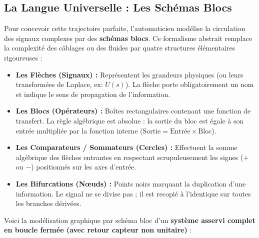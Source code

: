 \documentclass[11pt,a4paper]{report}
\begin{document}
\subsection{La Langue Universelle : Les Schémas Blocs}

Pour concevoir cette trajectoire parfaite, l'automaticien modélise la circulation des signaux complexes par des \textbf{schémas blocs}. Ce formalisme abstrait remplace la complexité des câblages ou des fluides par quatre structures élémentaires rigoureuses :
\begin{itemize}
    \item \textbf{Les Flèches (Signaux) :} Représentent les grandeurs physiques (ou leurs transformées de Laplace, ex: $U(s)$). La flèche porte obligatoirement un nom et indique le sens de propagation de l'information.
    \item \textbf{Les Blocs (Opérateurs) :} Boîtes rectangulaires contenant une fonction de transfert. La règle algébrique est absolue : la sortie du bloc est égale à son entrée multipliée par la fonction interne ($\text{Sortie} = \text{Entrée} \times \text{Bloc}$).
    \item \textbf{Les Comparateurs / Sommateurs (Cercles) :} Effectuent la somme algébrique des flèches entrantes en respectant scrupuleusement les signes ($+$ ou $-$) positionnés sur les axes d'entrée.
    \item \textbf{Les Bifurcations (Nœuds) : } Points noirs marquant la duplication d'une information. Le signal ne se divise pas ; il est recopié à l'identique sur toutes les branches dérivées.
\end{itemize}

Voici la modélisation graphique par schéma bloc d'un \textbf{système asservi complet en boucle fermée (avec retour capteur non unitaire)} :
\end{document}
